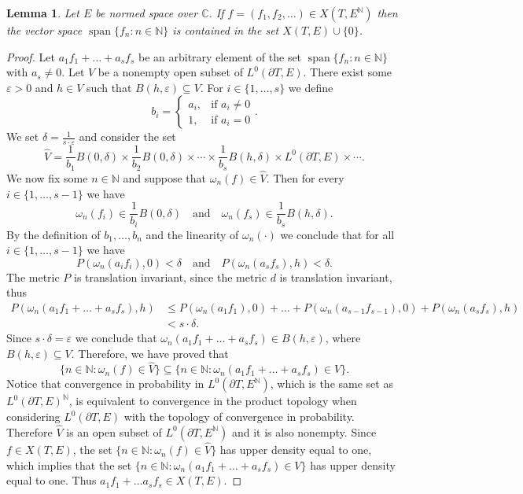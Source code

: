 \documentclass[twoside, 11pt]{article}
\DeclareMathOperator{\Span}{span}
\newcommand{\dis}{\displaystyle}
\renewcommand{\leq}{\leqslant}
\newcommand{\C}{\mathbb{C}}
\newcommand{\N}{\mathbb{N}}
\newcommand{\e}{\varepsilon}
\theoremstyle{plain}
\newtheorem{lemma}[theorem]{Lemma}
\theoremstyle{definition}
\begin{document}
\begin{lemma}
\label{lem:linearity}
Let $E$ be normed space over $\C$.
If $f = (f_1,f_2,\dots) \in X(T,E^{\N})$ then the vector space $\Span\{f_n : n\in \N\}$ is contained in the set $X(T,E) \cup \{0\}$.
\end{lemma}
\begin{proof}
Let $a_1f_1 + \dots + a_sf_s$ be an arbitrary element of the set $\Span\{f_n : n\in \N\}$ with $a_s \neq 0$.
Let $V$ be a nonempty open subset of $L^0(\partial T, E)$.
There exist some $\e > 0$ and $h \in V$ such that $B(h,\e) \subseteq V$.
For $i \in \{1,\dots, s\}$ we define
$$
b_i =
\begin{cases}
a_i, &\text{if } a_i \neq 0 \\
1, &\text{if } a_i = 0
\end{cases}.
$$
We set $\delta = \dis{\frac{1}{s\cdot \e}}$ and consider the set
$$
\widehat{V} = \frac{1}{b_1}B(0,\delta) \times \frac{1}{b_2}B(0,\delta) \times \cdots \times \frac{1}{b_s}B(h,\delta) \times L^0(\partial T, E) \times \cdots.
$$
We now fix some $n \in \N$ and suppose that $\omega_n(f) \in \widehat{V}$.
Then for every $i \in \{1,\dots,s-1\}$ we have
$$\omega_n(f_i) \in \frac{1}{b_i}B(0,\delta) \text{~~~and~~~} \omega_n(f_s) \in \frac{1}{b_s}B(h,\delta).$$
By the definition of $b_1,\dots,b_n$ and the linearity of $\omega_n(\cdot)$ we conclude that for all $i \in \{1,\dots,s-1\}$ we have
$$P(\omega_n(a_if_i), 0) < \delta \text{~~~and~~~} P(\omega_n(a_sf_s), h) < \delta.$$
The metric $P$ is translation invariant, since the metric $d$ is translation invariant, thus
\begin{align*}
P(\omega_n(a_1f_1 + \dots + a_sf_s), h) &\leq P(\omega_n(a_1f_1), 0) + \dots + P(\omega_n(a_{s-1}f_{s-1}),0) + P(\omega_n(a_sf_s),h) \\
&< s\cdot \delta.
\end{align*}
Since $s\cdot \delta = \e$ we conclude that $\omega_n(a_1f_1+\dots+a_sf_s) \in B(h,\e)$, where $B(h, \e) \subseteq V$.
Therefore, we have proved that
$$\{n \in \N: \omega_n(f) \in \widehat{V} \} \subseteq \{n \in \N: \omega_n(a_1f_1 + \dots + a_sf_s) \in V\}.$$
Notice that convergence in probability in $L^0(\partial T,E^\N)$, which is the same set as $L^0(\partial T,E)^\N$, is equivalent to convergence in the product topology when considering $L^0(\partial T,E)$ with the topology of convergence in probability.
Therefore $\widehat{V}$ is an open subset of $L^0(\partial T,E^\N)$ and it is also nonempty.
Since $f \in X(T,E)$, the set $\{n \in \N: \omega_n(f) \in \widehat{V}\}$ has upper density equal to one, which implies that the set $\{n \in \N: \omega_n(a_1f_1 + \dots + a_sf_s) \in V\}$ has upper density equal to one.
Thus $a_1f_1 + \dots a_sf_s \in X(T,E)$.
\end{proof}
\end{document}

